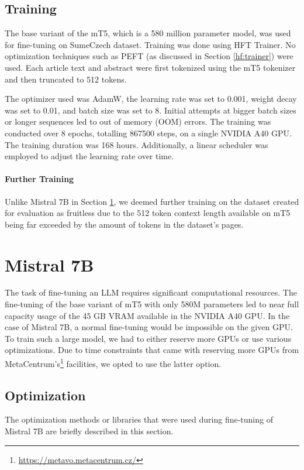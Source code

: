\documentclass[english, ba, kiv, he, iso690numb, pdf, viewonly]{fasthesis}
\begin{document}
\subsection{Training}
The base variant of the mT5, which is a 580 million parameter model, was used for fine-tuning on SumeCzech dataset. Training was done using HFT Trainer. No optimization techniques such as PEFT (as discussed in Section \ref{hf:trainer}) were used. Each article text and abstract were first tokenized using the mT5 tokenizer and then truncated to 512 tokens.

The optimizer used was AdamW, the learning rate was set to 0.001, weight decay was set to 0.01, and batch size was set to 8. Initial attempts at bigger batch sizes or longer sequences led to out of memory (OOM) errors. The training was conducted over 8 epochs, totalling 867500 steps, on a single NVIDIA A40 GPU. The training duration was 168 hours. Additionally, a linear scheduler was employed to adjust the learning rate over time.
\paragraph{Further Training}
Unlike Mistral 7B in Section \ref{impl:m7b}, we deemed further training on the dataset created for evaluation as fruitless due to the 512 token context length available on mT5 being far exceeded by the amount of tokens in the dataset's pages.
\section{Mistral 7B} \label{impl:m7b}
The task of fine-tuning an LLM requires significant computational resources. The fine-tuning of the base variant of mT5 with only 580M parameters led to near full capacity usage of the 45 GB VRAM available in the NVIDIA A40 GPU. In the case of Mistral 7B, a normal fine-tuning would be impossible on the given GPU. To train such a large model, we had to either reserve more GPUs or use various optimizations. Due to time constraints that came with reserving more GPUs from MetaCentrum's\footnote{\url{https://metavo.metacentrum.cz/}} facilities, we opted to use the latter option.
\subsection{Optimization}
The optimization methods or libraries that were used during fine-tuning of Mistral 7B are briefly described in this section.
\end{document}
